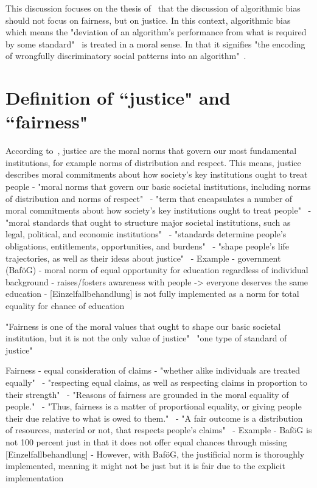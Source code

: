 
This discussion focuses on the thesis of~\cite{vredenburgh} that the discussion of algorithmic bias should not focus on fairness, but on justice.
In this context, algorithmic bias which means the "deviation of an algorithm’s performance from what is required by some standard"~\parencite[][1]{vredenburgh} is treated in a moral sense.
In that it signifies "the encoding of wrongfully discriminatory social patterns into an algorithm"~\parencite[][2]{vredenburgh}.

\section*{Definition of ``justice" and ``fairness" }

According to~\cite[3, 11--12]{vredenburgh}, justice are the moral norms that govern our most fundamental institutions, for example norms of distribution and respect.
This means, justice describes moral commitments about how society’s key institutions ought to treat people
- "moral norms that govern our basic societal institutions, including norms of distribution and norms of respect"~\parencite[][3]{vredenburgh}
- "term that encapsulates a number of moral commitments about how society’s key institutions ought to treat people"~\parencite[][11]{vredenburgh}
- "moral standards that ought to structure major societal institutions, such as legal, political, and economic institutions"~\parencite[][11]{vredenburgh}
- "standards determine people’s obligations, entitlements, opportunities, and burdens"~\parencite[][12]{vredenburgh}
- "shape people’s life trajectories, as well as their ideas about justice"~\parencite[][12]{vredenburgh}
- Example
  - government (BaföG)
  - moral norm of equal opportunity for education regardless of individual background
  - raises/fosters awareness with people -> everyone deserves the same education
  - [Einzelfallbehandlung] is not fully implemented as a norm for total equality for chance of education


"Fairness is one of the moral values that ought to shape our basic societal institution, but it is not the only value of justice"~\parencite[][3]{vredenburgh}
"one type of standard of justice"~\parencite[][11]{vredenburgh}


Fairness
- equal consideration of claims
- "whether alike individuals are treated equally"~\parencite[][3]{vredenburgh}
- "respecting equal claims, as well as respecting claims in proportion to their strength"~\parencite[][13]{vredenburgh}
- "Reasons of fairness are grounded in the moral equality of people."~\parencite[][13]{vredenburgh}
- "Thus, fairness is a matter of proportional equality, or giving people their due relative to what is owed to them."~\parencite[][13]{vredenburgh}
- "A fair outcome is a distribution of resources, material or not, that respects people’s claims"~\parencite[][13]{vredenburgh}
- Example
  - BaföG is not 100 percent just in that it does not offer equal chances through missing [Einzelfallbehandlung]
  - However, with BaföG, the justificial norm is thoroughly implemented, meaning it might not be just but it is fair due to the explicit implementation

